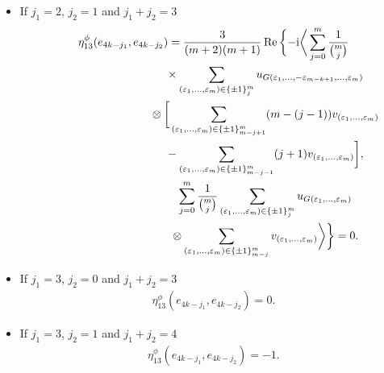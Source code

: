 \documentclass[10pt,a4paper]{amsart}
\numberwithin{equation}{section}
\begin{document}
\begin{enumerate}
\begin{itemize}
\begin{gather*}
 = \frac{-3}{(m+2)(m+1)}\sum_{j=0}^{m}\frac{1}{{m\choose j}}\bigg[ {-}{{{m-1}\choose{j-1}}}{{m\choose
{m-j+1}}}\\
\hphantom{\eta_{13}^\phi(e_{4k-j_1},e_{4k-j_2})=}{}\times
\frac{1}{{m\choose{j-1}}}{(m-j+1)} {{- {{m-1}\choose j}}{{m}\choose{m-j-1}}}
 \frac{1}{{m\choose
{j+1}}}(j+1)\bigg] \\
\hphantom{\eta_{13}^\phi(e_{4k-j_1},e_{4k-j_2})}{}
 = \frac{-3}{m(m+2)(m+1)}\sum_{j=0}^{m}\big(2j^2-2mj-m\big)=1.
\end{gather*}
\item[ii)] If $j_1=2$, $j_2=1$ and $j_1+j_2=3$
\begin{gather*}
 \eta_{13}^\phi(e_{4k-j_1},e_{4k-j_2}) =
 \frac{3}{(m+2)(m+1)}\operatorname{Re}\bigg\{ {-}{\rm i}\bigg\langle \sum_{j=0}^{m}\frac{1}{{m\choose
j}}\\
\hphantom{\eta_{13}^\phi(e_{4k-j_1},e_{4k-j_2}) =}{}\times
\sum_{(\varepsilon_{1},\dots ,\varepsilon_{m})\in\{\pm 1\}_{j}^{m}}u_{G(\varepsilon_{1},\dots,
-\varepsilon_{m-k+1},\dots,\varepsilon_{m})}\\
\hphantom{\eta_{13}^\phi(e_{4k-j_1},e_{4k-j_2}) =}{}
\otimes\bigg[ \sum_{(\varepsilon_{1},\dots, \varepsilon_{m})\in\{\pm
1\}_{m-j+1}^{m}}(m-(j-1))v_{(\varepsilon_{1},\dots,\varepsilon_m)}\\
\hphantom{\eta_{13}^\phi(e_{4k-j_1},e_{4k-j_2}) =}{}
-\sum_{(\varepsilon_{1},\dots, \varepsilon_{m})\in\{\pm
1\}_{m-j-1}^{m}}(j+1)v_{(\varepsilon_{1},\dots,\varepsilon_m)}\bigg] ,\\
\hphantom{\eta_{13}^\phi(e_{4k-j_1},e_{4k-j_2}) =}{}
 \sum_{j=0}^{m}\frac{1}{{m\choose j}}\sum_{(\varepsilon_{1},\dots, \varepsilon_{m})\in\{\pm
1\}_{j}^{m}}u_{G(\varepsilon_1,\dots,\varepsilon_m)}\\
\hphantom{\eta_{13}^\phi(e_{4k-j_1},e_{4k-j_2}) =}{}
\otimes
\sum_{(\varepsilon_{1},\dots ,\varepsilon_{m})\in\{\pm 1\}_{m-j}^{m}}v_{(\varepsilon_1,\dots,\varepsilon_m)}\bigg\rangle\bigg\} =0.
\end{gather*}
\item[iii)] If $j_1=3$, $j_2=0$ and $j_1+j_2=3$
\begin{gather*}
 \eta_{13}^\phi(e_{4k-j_1},e_{4k-j_2}) =0.
\end{gather*}
\item[iv)] If $j_1=3$, $j_2=1$ and $j_1+j_2=4$
\begin{gather*}
 \eta_{13}^\phi(e_{4k-j_1},e_{4k-j_2})=-1.
\end{gather*}
\end{itemize}
\end{enumerate}
\end{document}
